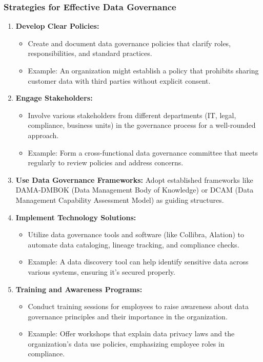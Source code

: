 \documentclass[aspectratio=169]{beamer}
\begin{document}
\begin{frame}[fragile]
    \frametitle{Strategies for Effective Data Governance}
    \begin{enumerate}
        \item \textbf{Develop Clear Policies:}
            \begin{itemize}
                \item Create and document data governance policies that clarify roles, responsibilities, and standard practices.
                \item Example: An organization might establish a policy that prohibits sharing customer data with third parties without explicit consent.
            \end{itemize}
        
        \item \textbf{Engage Stakeholders:}
            \begin{itemize}
                \item Involve various stakeholders from different departments (IT, legal, compliance, business units) in the governance process for a well-rounded approach.
                \item Example: Form a cross-functional data governance committee that meets regularly to review policies and address concerns.
            \end{itemize}
        
        \item \textbf{Use Data Governance Frameworks:}   
        Adopt established frameworks like DAMA-DMBOK (Data Management Body of Knowledge) or DCAM (Data Management Capability Assessment Model) as guiding structures.
        
        \item \textbf{Implement Technology Solutions:}
            \begin{itemize}
                \item Utilize data governance tools and software (like Collibra, Alation) to automate data cataloging, lineage tracking, and compliance checks.
                \item Example: A data discovery tool can help identify sensitive data across various systems, ensuring it’s secured properly.
            \end{itemize}
        
        \item \textbf{Training and Awareness Programs:}
            \begin{itemize}
                \item Conduct training sessions for employees to raise awareness about data governance principles and their importance in the organization.
                \item Example: Offer workshops that explain data privacy laws and the organization's data use policies, emphasizing employee roles in compliance.
            \end{itemize}
    \end{enumerate}
\end{frame}
\end{document}
